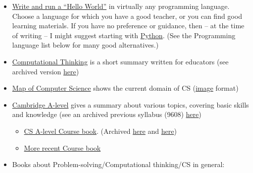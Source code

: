 \documentclass{article}
\begin{document}
\begin{itemize}

    \item \underline{Write and run a ``Hello World''} in virtually any programming language. Choose a language for which you have a good teacher, or you can find good learning materials. If you have no preference or guidance, then -- at the time of writing -- I might suggest starting with \href{https://www.python.org/}{Python}. (See the Programming language list below for many good alternatives.)
    
    \item \href{https://www.cs.cmu.edu/~15110-s13/Wing06-ct.pdf}{Computational Thinking} is a short summary written for educators (see archived version \href{https://web.archive.org/web/20240429195355/https://www.cs.cmu.edu/~15110-s13/Wing06-ct.pdf}{here})
    
    \item \href{https://www.youtube.com/watch?v=SzJ46YA_RaA}{Map of Computer Science} shows the current domain of CS (\href{https://i.pinimg.com/originals/b0/d1/da/b0d1da585ebcac73f17e10e91b30eaf6.png}{image} format)

    \item \href{https://www.cambridgeinternational.org/programmes-and-qualifications/cambridge-international-as-and-a-level-computer-science-9618/}{Cambridge A-level} gives a summary about various topics, covering basic skills and knowledge (see an archived previous syllabus (9608) \href{https://web.archive.org/web/20220119055409/https://www.cambridgeinternational.org/programmes-and-qualifications/cambridge-international-as-and-a-level-computer-science-9608/}{here})
    \begin{itemize}
        \item \href{https://www.goodreads.com/book/show/13725701-cambridge-international-as-and-a-level-computing-coursebook}{CS A-level Course book}. (Archived \href{https://web.archive.org/web/20240000000000*/https://www.gceguide.xyz/files/e-books/a-level/Computing.pdf}{here} and \href{https://web.archive.org/web/20200701000000*/https://www.gceguide.xyz/gce-e-books/cambridge-international-as-a-level-computer-science-coursebook}{here})
        \item \href{https://www.goodreads.com/book/show/42926237-cambridge-international-as-a-level-computer-science}{More recent Course book}
    \end{itemize}
     
    \item Books about Problem-solving/Computational thinking/CS in general:
    \begin{itemize}


\end{itemize}
\end{itemize}
\end{document}
